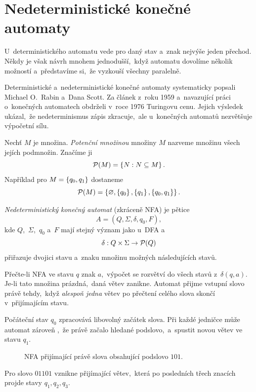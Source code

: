 \section{Nedeterministické konečné automaty}\label{sec:nedet-automaty}

U~deterministického automatu vede pro daný stav a~znak nejvýše jeden přechod. Někdy je však návrh mnohem jednodušší,~když automatu dovolíme několik možností a~představíme si,~že vyzkouší všechny paralelně.

\begin{remark}
    Deterministické a~nedeterministické konečné automaty systematicky popsali Michael O.~Rabin a~Dana Scott. Za článek z~roku 1959 a~navazující práci o~konečných automatech obdrželi v~roce 1976 Turingovu cenu. Jejich výsledek ukázal,~že nedeterminismus zápis zkracuje,~ale u~konečných automatů nezvětšuje výpočetní sílu.
\end{remark}

\begin{definition}
    Nechť $M$ je množina. \emph{Potenční množinou} množiny $M$ nazveme množinu všech jejích podmnožin. Značíme ji
    \[
        \mathcal{P}(M)=\left\{N:N\subseteq M\right\}.
    \]
    Například pro $M=\left\{q_0,q_1\right\}$ dostaneme
    \[
        \mathcal{P}(M)=\left\{\varnothing,\left\{q_0\right\},\left\{q_1\right\},\left\{q_0,q_1\right\}\right\}.
    \]
\end{definition}

\begin{definition}
    \emph{Nedeterministický konečný automat} (zkráceně NFA) je pětice
    \[A=(Q,\Sigma,\delta,q_0,F),\]
    kde $Q$,~$\Sigma$,~$q_0$ a~$F$ mají stejný význam jako u~DFA a
    \[\delta:Q\times\Sigma \rightarrow \mathcal{P}(Q)\]
    přiřazuje dvojici stavu a~znaku množinu možných následujících stavů.
\end{definition}

Přečte-li NFA ve stavu $q$ znak $a$,~výpočet se rozvětví do všech stavů z~$\delta(q,a)$. Je-li tato množina prázdná,~daná větev zanikne. Automat přijme vstupní slovo právě tehdy,~když \emph{alespoň jedna} větev po přečtení celého slova skončí v~přijímajícím stavu.

\begin{example}\label{ex:nfa-101}
    Počáteční stav $q_0$ zpracovává libovolný začátek slova. Při každé jedničce může automat zároveň ,~že právě začalo hledané podslovo,~a~spustit novou větev ve stavu $q_1$.
    \begin{figure}[h]
        \centering
        
        \caption{NFA přijímající právě slova obsahující podslovo $101$.}
        \label{fig:nfa-101}
    \end{figure}
    Pro slovo $01101$ vznikne přijímající větev,~která po posledních třech znacích projde stavy $q_1,q_2,q_3$.
\end{example}

